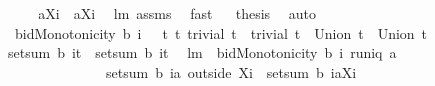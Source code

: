 \begin{isabellebody}
\isamarkupfalse%
\isanewline
{}\isamarkupfalse%
\ \isamarkupfalse%
\ \isanewline
{}{\isacharcolon}\ {\isachardoublequoteopen}{\isacharbraceleft}{\isasymUnion}{\isacharparenleft}a{\isacharbackquote}{\isacharbackquote}{\isacharparenleft}X{\isasymunion}{\isacharbraceleft}i{\isacharbraceright}{\isacharparenright}{\isacharparenright}{\isacharbraceright}{\isacharminus}{\isacharbraceleft}{\isacharbraceleft}{\isacharbraceright}{\isacharbraceright}\ {\isacharequal}\ {\isacharbraceleft}{\isasymUnion}{\isacharparenleft}a{\isacharbackquote}{\isacharbackquote}{\isacharparenleft}X{\isasymunion}{\isacharbraceleft}i{\isacharbraceright}{\isacharparenright}{\isacharparenright}{\isacharbraceright}{\isachardoublequoteclose}\ \isamarkupfalse%
\ lm{}{}\ assms\ \isamarkupfalse%
\ fast\isanewline
{}\isamarkupfalse%
\ \isamarkupfalse%
\ {\isacharquery}thesis\ \isamarkupfalse%
\ auto\isanewline
{}\isamarkupfalse%
%
\endisatagproof
{\isafoldproof}%
%
\isadelimproof
\isanewline
%
\endisadelimproof
\isanewline
\isanewline
{}\isamarkupfalse%
\ {\isachardoublequoteopen}bidMonotonicity\ b\ i\ {\isacharequal}{\isacharequal}\ {\isacharparenleft}{\isasymforall}\ t\ t{\isacharprime}{\isachardot}\ {\isacharparenleft}trivial\ t\ {\isacharampersand}\ trivial\ t{\isacharprime}\ {\isacharampersand}\ Union\ t\ {\isasymsubseteq}\ Union\ t{\isacharprime}{\isacharparenright}\ {\isasymlongrightarrow}\isanewline
setsum\ b\ {\isacharparenleft}{\isacharbraceleft}i{\isacharbraceright}{\isasymtimes}t{\isacharparenright}\ {\isasymle}\ setsum\ b\ {\isacharparenleft}{\isacharbraceleft}i{\isacharbraceright}{\isasymtimes}t{\isacharprime}{\isacharparenright}{\isacharparenright}{\isachardoublequoteclose}\ \isanewline
\isanewline
\isanewline
{}\isamarkupfalse%
\ lm{}{}{\isacharcolon}\ \ {\isachardoublequoteopen}bidMonotonicity\ b\ i{\isachardoublequoteclose}\ {\isachardoublequoteopen}runiq\ a{\isachardoublequoteclose}\ \isanewline
\ \ \ \ \ \ \ \ \ \ \ \ \ \ {\isachardoublequoteopen}setsum\ b\ {\isacharparenleft}{\isacharbraceleft}i{\isacharbraceright}{\isasymtimes}{\isacharparenleft}{\isacharparenleft}a\ outside\ X{\isacharparenright}{\isacharbackquote}{\isacharbackquote}{\isacharbraceleft}i{\isacharbraceright}{\isacharparenright}{\isacharparenright}\ {\isasymle}\ setsum\ b\ {\isacharparenleft}{\isacharbraceleft}i{\isacharbraceright}{\isasymtimes}{\isacharbraceleft}{\isasymUnion}{\isacharparenleft}a{\isacharbackquote}{\isacharbackquote}{\isacharparenleft}X{\isasymunion}{\isacharbraceleft}i{\isacharbraceright}{\isacharparenright}{\isacharparenright}{\isacharbraceright}{\isacharparenright}{\isachardoublequoteclose}\isanewline

\end{isabellebody}
